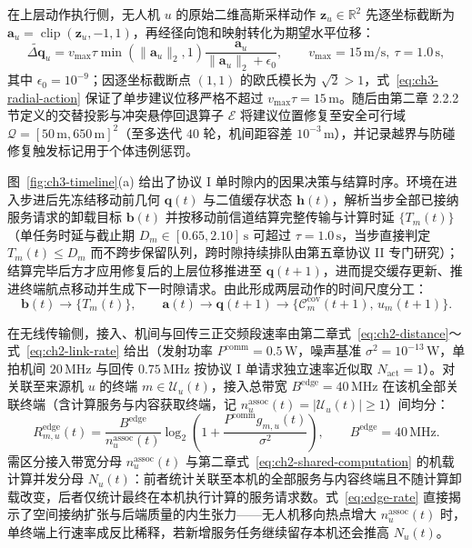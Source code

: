 在上层动作执行侧，无人机 $u$ 的原始二维高斯采样动作 $\mathbf{z}_u\in\mathbb{R}^2$ 先逐坐标截断为 $\mathbf{a}_u=\operatorname{clip}(\mathbf{z}_u,-1,1)$，再经径向饱和映射转化为期望水平位移：
\begin{equation}
 \widetilde{\Delta\mathbf q}_u
 =v_{\max}\tau\min(\|\mathbf a_u\|_2,1)
   \frac{\mathbf a_u}{\|\mathbf a_u\|_2+\epsilon_0},
 \qquad v_{\max}=15\,\mathrm{m/s},\ \tau=1.0\,\mathrm{s},
 \label{eq:ch3-radial-action}
\end{equation}
其中 $\epsilon_0=10^{-9}$；因逐坐标截断点 $(1,1)$ 的欧氏模长为 $\sqrt{2}>1$，式~\eqref{eq:ch3-radial-action} 保证了单步建议位移严格不超过 $v_{\max}\tau=15\,\mathrm{m}$。随后由第二章 2.2.2 节定义的交替投影与冲突悬停回退算子 $\mathcal{E}$ 将建议位置修复至安全可行域 $\mathcal{Q}=[50\,\mathrm{m},650\,\mathrm{m}]^2$（至多迭代 $40$ 轮，机间距容差 $10^{-3}\,\mathrm{m}$），并记录越界与防碰修复触发标记用于个体违例惩罚。

图~\ref{fig:ch3-timeline}(a) 给出了协议 I 单时隙内的因果决策与结算时序。环境在进入步进后先冻结移动前几何 $\mathbf{q}(t)$ 与二值缓存状态 $\mathbf{h}(t)$，解析当步全部已接纳服务请求的卸载目标 $\mathbf{b}(t)$ 并按移动前信道结算完整传输与计算时延 $\{T_m(t)\}$（单任务时延与截止期 $D_m\in[0.65,2.10]\,\mathrm{s}$ 可超过 $\tau=1.0\,\mathrm{s}$，当步直接判定 $T_m(t)\leq D_m$ 而不跨步保留队列，跨时隙持续排队由第五章协议 II 专门研究）；结算完毕后方才应用修复后的上层位移推进至 $\mathbf{q}(t+1)$，进而提交缓存更新、推进终端航点移动并生成下一时隙请求。由此形成两层动作的时间尺度分工：
\begin{equation}
 \mathbf b(t)\longrightarrow\{T_m(t)\},\qquad
 \mathbf a(t)\longrightarrow\mathbf q(t+1)
 \longrightarrow\big\{\mathcal C_m^{\mathrm{cov}}(t+1),\,u_m(t+1)\big\}.
 \label{eq:ch3-two-action-timing}
\end{equation}

在无线传输侧，接入、机间与回传三正交频段速率由第二章式~\eqref{eq:ch2-distance}～式~\eqref{eq:ch2-link-rate} 给出（发射功率 $P^{\mathrm{comm}}=0.5\,\mathrm{W}$，噪声基准 $\sigma^2=10^{-13}\,\mathrm{W}$，单拍机间 $20\,\mathrm{MHz}$ 与回传 $0.75\,\mathrm{MHz}$ 按协议 I 单请求独立速率近似取 $N_{\mathrm{act}}=1$）。对关联至来源机 $u$ 的终端 $m\in\mathcal{U}_u(t)$，接入总带宽 $B^{\mathrm{edge}}=40\,\mathrm{MHz}$ 在该机全部关联终端（含计算服务与内容获取终端，记 $n_u^{\mathrm{assoc}}(t)=|\mathcal{U}_u(t)|\geq 1$）间均分：
\begin{equation}
 R^{\mathrm{edge}}_{m,u}(t)=
 \frac{B^{\mathrm{edge}}}{n_u^{\mathrm{assoc}}(t)}
 \log_2\left(1+\frac{P^{\mathrm{comm}}g_{m,u}(t)}{\sigma^2}\right),
 \qquad B^{\mathrm{edge}}=40\,\mathrm{MHz}.
 \label{eq:edge-rate}
\end{equation}
需区分接入带宽分母 $n_u^{\mathrm{assoc}}(t)$ 与第二章式~\eqref{eq:ch2-shared-computation} 的机载计算并发分母 $N_u(t)$：前者统计关联至本机的全部服务与内容终端且不随计算卸载改变，后者仅统计最终在本机执行计算的服务请求数。式~\eqref{eq:edge-rate} 直接揭示了空间接纳扩张与后端质量的内生张力——无人机移向热点增大 $n_u^{\mathrm{assoc}}(t)$ 时，单终端上行速率成反比稀释，若新增服务任务继续留存本机还会推高 $N_u(t)$。

